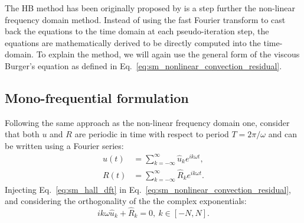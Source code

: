 
The HB method has been originally
 proposed by \citet{Hall2002}
is a step further the non-linear frequency domain method. Instead
of using the fast Fourier transform to cast back the equations
to the time domain at each pseudo-iteration step, 
the equations are mathematically derived to be directly
computed into the time-domain.
To explain the method, we will again use the general form of 
the viscous Burger's equation as defined in
Eq.~\ref{eq:sm_nonlinear_convection_residual}.

\subsection{Mono-frequential formulation}

Following the same approach as the non-linear frequency domain one,
consider that both $u$ and $R$ are periodic
in time with respect to period $T = 2 \pi / \omega$
and can be written using a Fourier series:
\begin{equation}
	\begin{split}
		u(t) &= \sum_{k=-\infty}^{\infty} \widehat{u}_k e^{i k \omega t}, \\
		R(t) &= \sum_{k=-\infty}^{\infty} \widehat{R}_k e^{i k \omega t}.
		\label{eq:sm_hall_dft}
	\end{split}
\end{equation}
Injecting Eq.~\ref{eq:sm_hall_dft} in 
Eq.~\ref{eq:sm_nonlinear_convection_residual}, and considering
the orthogonality of the the complex exponentials:
\begin{equation}
	i k \omega \widehat{u}_k + \widehat{R}_k = 0, \: k \in [-N, N].
	\label{eq:sm_hall_frequential_eq}
\end{equation}

